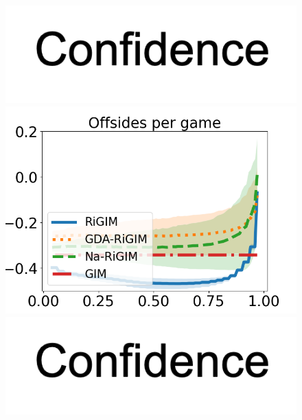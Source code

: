 \documentclass{article}
\begin{document}
\begin{figure}[htbp]
\begin{minipage}{0.16\textwidth}
    \vspace{-0.05in}
    \includegraphics[scale=0.12]{figures/confidence_x_label.png}
    \end{minipage}
    \begin{minipage}{0.16\textwidth}
    \centering
    \includegraphics[scale=0.14]{figures/soccer_risk_curve_Offsides_shadow.png}\par
    \vspace{-0.05in}
    \includegraphics[scale=0.12]{figures/confidence_x_label.png}
    \end{minipage}
    \begin{minipage}{0.16\textwidth}
    \centering

\end{minipage}
\end{figure}
\end{document}
